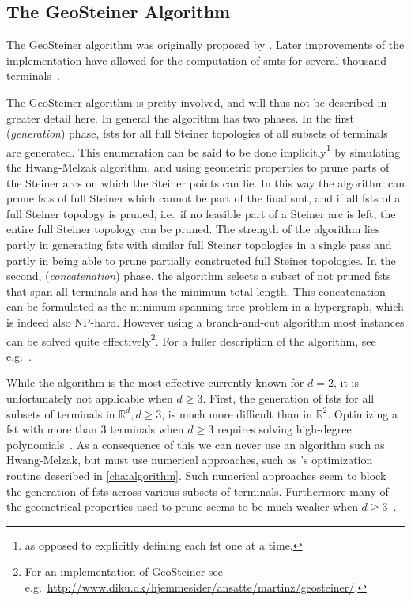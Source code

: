\subsection{The GeoSteiner Algorithm}
\label{sec:geosteiner-algorithm}


The GeoSteiner algorithm was originally proposed by \textcite{winter1985}. Later
improvements of the implementation have allowed for the computation of \acp{smt}
for several thousand terminals~\cite{brazil2015}.

The GeoSteiner algorithm is pretty involved, and will thus not be described in
greater detail here. In general the algorithm has two phases. In the first
(\textit{generation}) phase, \acp{fst} for all full Steiner topologies of all
subsets of terminals are generated. This enumeration can be said to be done
implicitly\footnote{as opposed to explicitly defining each \ac{fst} one at a
  time.} by simulating the Hwang-Melzak algorithm, and using geometric
properties to prune parts of the Steiner arcs on which the Steiner points can
lie. In this way the algorithm can prune \acp{fst} of full Steiner which cannot
be part of the final \ac{smt}, and if all \acp{fst} of a full Steiner topology
is pruned, i.e.\ if no feasible part of a Steiner arc is left, the entire full
Steiner topology can be pruned. The strength of the algorithm lies partly in
generating \acp{fst} with similar full Steiner topologies in a single pass and
partly in being able to prune partially constructed full Steiner topologies. In
the second, (\textit{concatenation}) phase, the algorithm selects a subset of
not pruned \acp{fst} that span all terminals and has the minimum total
length. This concatenation can be formulated as the minimum spanning tree
problem in a hypergraph, which is indeed also NP-hard. However using a
branch-and-cut algorithm most instances can be solved quite
effectively\footnote{For an implementation of GeoSteiner see e.g.\
  \url{http://www.diku.dk/hjemmesider/ansatte/martinz/geosteiner/}.}. For a
fuller description of the algorithm, see e.g.\ \textcite[sec.~1.4]{brazil2015}.

While the algorithm is the most effective currently known for $d = 2$, it is
unfortunately not applicable when $d \ge 3$. First, the generation of \acp{fst}
for all subsets of terminals in $\mathbb{R}^d, d \ge 3$, is much more difficult
than in $\mathbb{R}^2$. Optimizing a \ac{fst} with more than $3$ terminals when
$d \ge 3$ requires solving high-degree polynomials~\cite{smith1992}. As a
consequence of this we can never use an algorithm such as Hwang-Melzak, but must
use numerical approaches, such as \citeauthor{smith1992}'s optimization routine
described in \cref{cha:algorithm}. Such numerical approaches seem to block the
generation of \acp{fst} across various subsets of terminals. Furthermore many of
the geometrical properties used to prune seems to be much weaker when
$d \ge 3$~\cite{fonseca2014}.

